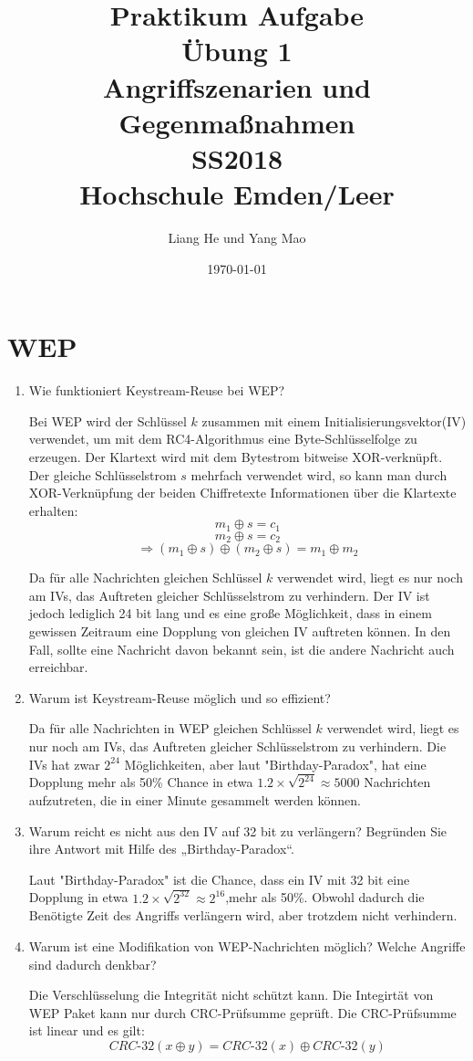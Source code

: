 \documentclass[12pt,a4paper]{article}
\title{	
\textbf{Praktikum Aufgabe\\
		Übung 1\\}
	    Angriffszenarien und\\ Gegenmaßnahmen \\
		SS2018\\
		Hochschule Emden/Leer}
\author{Liang He und Yang Mao}
\date{\today}
\newenvironment{exercise}
	{\begin{enumerate}[label=\bfseries\alph*).]\bfseries}
{\end{enumerate}}
\newenvironment{answer}{\par\normalfont}{}
\begin{document}
    \maketitle
    \newpage
    
    \tableofcontents
    \newpage
    \section{WEP}
    	\begin{exercise}
		\item Wie funktioniert Keystream-Reuse bei WEP?
			\begin{answer}
			Bei WEP wird der Schlüssel $k$ zusammen mit einem Initialisierungsvektor(IV) verwendet, um mit dem RC4-Algorithmus eine Byte-Schlüsselfolge zu erzeugen. Der Klartext wird mit dem Bytestrom bitweise XOR-verknüpft.\\
			Der gleiche Schlüsselstrom $s$ mehrfach verwendet wird, so kann man durch XOR-Verknüpfung der beiden Chiffretexte Informationen über die Klartexte erhalten:
			\[m_1 \oplus s = c_1\]
			\[m_2 \oplus s = c_2\]
			\[\Rightarrow (m_1 \oplus s)\oplus(m_2\oplus s)=m_1\oplus m_2\]
			
			Da für alle Nachrichten gleichen Schlüssel $k$ verwendet wird, liegt es nur noch am IVs, das Auftreten gleicher Schlüsselstrom zu verhindern. Der IV ist jedoch lediglich 24 bit lang und es eine große Möglichkeit, dass in einem gewissen Zeitraum eine Dopplung von gleichen IV auftreten können. In den Fall, sollte eine Nachricht davon bekannt sein, ist die andere Nachricht auch erreichbar.
			\end{answer}
		\item  Warum ist Keystream-Reuse möglich und so effizient?
		\begin{answer}
		Da für alle Nachrichten in WEP gleichen Schlüssel $k$ verwendet wird, liegt es nur noch am IVs, das Auftreten gleicher Schlüsselstrom zu verhindern. Die IVs hat zwar $2^{24}$ Möglichkeiten, aber laut "Birthday-Paradox", hat eine Dopplung mehr als 50\% Chance in etwa $1.2\times\sqrt{2^{24}} \approx 5000$ Nachrichten aufzutreten, die in einer Minute gesammelt werden können.
		\end{answer}
		\item Warum reicht es nicht aus den IV auf 32 bit zu verlängern? Begründen Sie ihre Antwort mit Hilfe des „Birthday-Paradox“.
		\begin{answer}
		Laut "Birthday-Paradox" ist die Chance, dass ein IV mit 32 bit eine Dopplung in etwa $1.2\times\sqrt{2^{32}} \approx 2^{16}$,mehr als 50\%. Obwohl dadurch die Benötigte Zeit des Angriffs verlängern wird, aber trotzdem nicht verhindern.   
		\end{answer}
		\item  Warum ist eine Modifikation von WEP-Nachrichten möglich? Welche Angriffe sind dadurch denkbar?
		\begin{answer}
		Die Verschlüsselung die Integrität nicht schützt kann. Die Integirtät von WEP Paket kann nur durch CRC-Prüfsumme geprüft. Die CRC-Prüfsumme ist linear und es gilt:
		\[CRC\text{-}32(x\oplus y)=CRC\text{-}32(x)\oplus CRC\text{-}32(y)\]
		

\end{answer}
\end{exercise}
\end{document}
